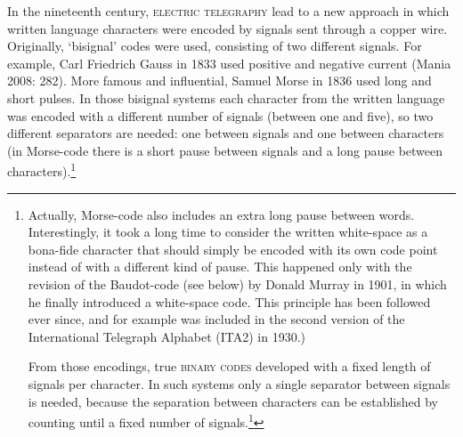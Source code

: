 {{In the nineteenth century, \textsc{electric telegraphy} lead to a new approach in which written language characters were encoded by signals sent through a copper wire. Originally, `bisignal' codes were used, consisting of two different signals. For example, Carl Friedrich Gauss in 1833 used positive and negative current (Mania 2008: 282). More famous and influential, Samuel Morse in 1836 used long and short pulses. In those bisignal systems each character from the written language was encoded with a different number of signals (between one and five), so two different separators are needed: one between signals and one between characters (in Morse-code there is a short pause between signals and a long pause between characters).\footnote{Actually, Morse-code also includes an extra long pause between words. Interestingly, it took a long time to consider the written white-space as a bona-fide character that should simply be encoded with its own code point instead of with a different kind of pause. This happened only with the revision of the Baudot-code (see below) by Donald Murray in 1901, in which he finally introduced a white-space code. This principle has been followed ever since, and for example was included in the second version of the International Telegraph Alphabet (ITA2) in 1930.)

From those encodings, true \textsc{binary codes} developed with a fixed length of signals per character. In such systems only a single separator between signals is needed, because the separation between characters can be established by counting until a fixed number of signals.\footnote{Of course, no explicit separator is needed when the timing of the signals is known, which is the principle used in all modern telecommunication systems. An important modern consideration is also how to know where to start counting when you did not catch the start of a message, something that is known in Unicode as `self synchronizing'.) In the context of electric telegraphy, such a system was first established by Émile Baudot in 1870, using a fixed combination of five signals for each written character.\footnote{True binary codes have a longer history, going at least back to the Baconian cipher devised by Francis Bacon in 1605.) There are 25 = 32 possible combination when using five binary signals; an encoding today designated as `5-bit'. These codes are sufficient for all Latin letters, but of course they do not suffice for all written symbols, including punctuation and digits. As a solution, the Baudot code uses a so-called `shift' character, which signifies that from that point onwards (until shifted back) a different encoding is used, allowing for yet another set of 32 codes. In effect, this means that the Baudot code, and the \textsc{International Telegraph Alphabet (ITA)} derived from it, had an extra `bit' of information, so the encoding is actually 6-bit (with 26 = 64 different possible characters). For decades, this encoding was the standard for all telegraphy and it is still in limited use today.

}}}}}
